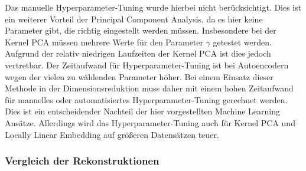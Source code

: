 Das manuelle Hyperparameter-Tuning wurde hierbei nicht berücksichtigt. Dies ist ein weiterer
Vorteil der Principal Component Analysis, da es hier keine Parameter gibt, die richtig eingestellt
werden müssen. Insbesondere bei der Kernel PCA müssen mehrere Werte für den Parameter $\gamma$
getestet werden. Aufgrund der relativ niedrigen Laufzeiten der Kernel PCA ist dies jedoch
vertretbar. Der Zeitaufwand für Hyperparameter-Tuning ist bei Autoencodern wegen der vielen zu
wählenden Parameter höher. Bei einem Einsatz dieser Methode in der Dimensionsreduktion muss daher
mit einem hohen Zeitaufwand für manuelles oder automatisiertes Hyperparameter-Tuning gerechnet
werden. Dies ist ein entscheidender Nachteil der hier vorgestellten Machine Learning Ansätze.
Allerdings wird das Hyperparameter-Tuning auch für Kernel PCA und Locally Linear Embedding auf
größeren Datensätzen teuer.

\subsubsection{Vergleich der Rekonstruktionen}

